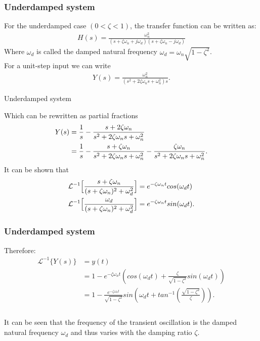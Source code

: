 \begin{frame}
\frametitle{Underdamped system}
For the underdamped case $(0< \zeta< 1)$, the transfer function can be written as:
\vspace{-0.25cm}
\begin{align*}
H(s)=\frac{\omega_n ^2}{(s+\zeta\omega_n+j\omega_d)(s+\zeta\omega_n-j\omega_d)}
\end{align*}
Where $\omega_d$ is called the damped natural frequency 
$\omega_d = \omega_n\sqrt{1-\zeta^2}$.\\
\vspace{1em}
For a unit-step input we can write
\vspace{-0.25cm} 
\begin{align*}
Y(s)=\frac{\omega_n ^2}{(s^2+2\zeta\omega_n s+\omega_n ^2)s}.
\end{align*}
\end{frame}

\begin{frame}{Underdamped system}

Which can be rewritten as partial fractions\\
\vspace{-0.5cm}
\begin{align*}
Y(s)&=\frac{1}{s} -\frac{s+2\zeta\omega_n}{s^2+2\zeta\omega_n s+ \omega_n ^2} \\ \vspace{2cm}
&= \frac{1}{s} -\frac{s+\zeta\omega_n}{s^2+2\zeta\omega_n s+ \omega_n ^2} -\frac{\zeta\omega_n}{s^2+2\zeta\omega_n s+ \omega_n ^2}.
\end{align*}
It can be shown that\\
\vspace{-1em} 
\begin{align*}
\mathcal{L}^{-1}\Big[\frac{s+\zeta\omega_n}{(s+\zeta\omega_n)^2+\omega_d ^2}\Big]&= e^{-\zeta\omega_n t}cos(\omega_d t)\\  \vspace{2cm}
\mathcal{L}^{-1}\Big[\frac{\omega_d}{(s+\zeta\omega_n)^2+\omega_d ^2}\Big]&= e^{-\zeta\omega_n t}sin(\omega_d t).
\end{align*}
\end{frame}


\begin{frame}
\frametitle{Underdamped system}
Therefore:\\ 
\vspace{-0.5em}
\begin{align*}
\mathcal{L}^{-1}\{Y(s)\} & =y(t)\\
& = 1 - e^{-\zeta\omega_n t}(cos(\omega_d t)+\frac{\zeta}{\sqrt{1 - \zeta^2}}sin(\omega_d t))\\
& = 1 - \frac{e^{-\zeta\omega_n t}}{\sqrt{1-\zeta^2}}sin(\omega_d t+ tan^{-1}(\frac{\sqrt{1-\zeta^2}}{\zeta})).\\
\end{align*}
\\
\vspace{-1em}
It can be seen that the frequency of the transient oscillation is the damped natural frequency $\omega_d$ and thus varies with the damping ratio $\zeta$.
\end{frame}

